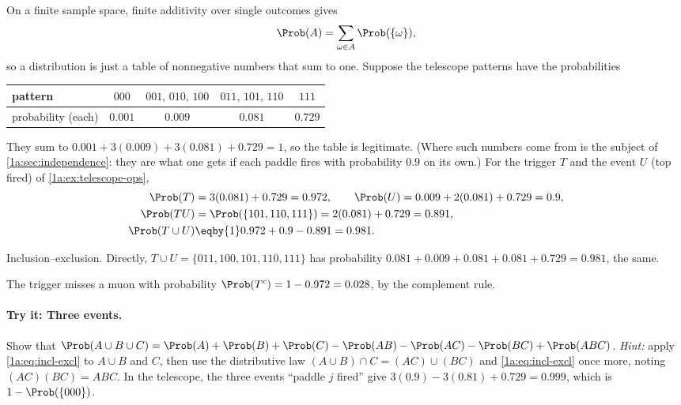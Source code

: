 \label{1a:ex:telescope-probs}
On a finite sample space, finite additivity over single outcomes gives
\begin{equation}
\Prob(A)=\sum_{\omega\in A}\Prob(\{\omega\}),
\label{1a:eq:sum-atoms}
\end{equation}
so a distribution is just a table of nonnegative numbers that sum to one.
Suppose the telescope patterns have the probabilities
\begin{center}
\begin{tabular}{@{}lcccc@{}}
\toprule
pattern & $000$ & $001,\,010,\,100$ & $011,\,101,\,110$ & $111$\\
\midrule
probability (each) & $0.001$ & $0.009$ & $0.081$ & $0.729$\\
\bottomrule
\end{tabular}
\end{center}
They sum to $0.001+3(0.009)+3(0.081)+0.729=1$, so the table is legitimate.
(Where such numbers come from is the subject of \cref{1a:sec:independence}:
they are what one gets if each paddle fires with probability $0.9$ on its own.)
For the trigger $T$ and the event $U$ (top fired) of \cref{1a:ex:telescope-ops},
\begin{align*}
\Prob(T) &= 3(0.081)+0.729 = 0.972, \qquad \Prob(U)=0.009+2(0.081)+0.729=0.9,\\
\Prob(TU) &= \Prob(\{101,110,111\}) = 2(0.081)+0.729=0.891,\\
\Prob(T\cup U) &\eqby{1} 0.972+0.9-0.891 = 0.981 .
\end{align*}
\begin{explain}
  \item Inclusion--exclusion. Directly, $T\cup U=\{011,100,101,110,111\}$ has
        probability $0.081+0.009+0.081+0.081+0.729=0.981$, the same.
\end{explain}
The trigger misses a muon with probability $\Prob(T^c)=1-0.972=0.028$, by the
complement rule.

\paragraph{Try it: Three events.}
Show that
$\Prob(A\cup B\cup C)=\Prob(A)+\Prob(B)+\Prob(C)-\Prob(AB)-\Prob(AC)-\Prob(BC)+\Prob(ABC)$.
\emph{Hint:} apply \eqref{1a:eq:incl-excl} to $A\cup B$ and $C$, then use the
distributive law $(A\cup B)\cap C=(AC)\cup(BC)$ and \eqref{1a:eq:incl-excl}
once more, noting $(AC)(BC)=ABC$. In the telescope, the three events ``paddle
$j$ fired'' give $3(0.9)-3(0.81)+0.729=0.999$, which is $1-\Prob(\{000\})$.

